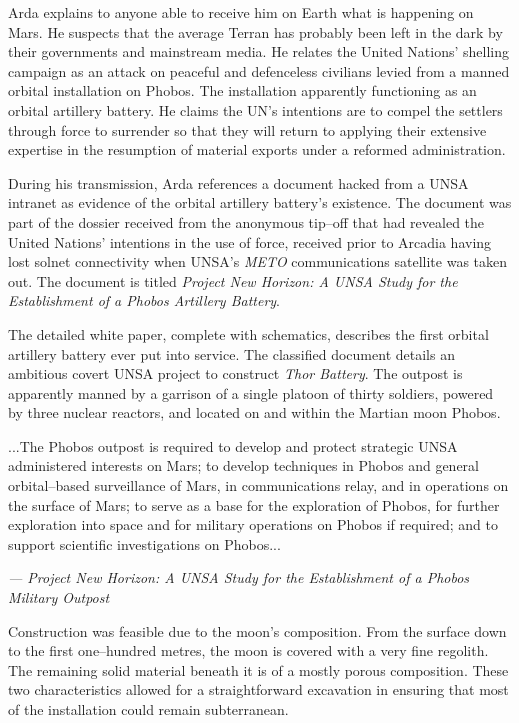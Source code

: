 Arda explains to anyone able to receive him on Earth what is happening on Mars. He suspects that the average Terran has probably been left in the dark by their governments and mainstream media. He relates the United Nations' shelling campaign as an attack on peaceful and defenceless civilians levied from a manned orbital installation on Phobos. The installation apparently functioning as an orbital artillery battery. He claims the UN's intentions are to compel the settlers through force to surrender so that they will return to applying their extensive expertise in the resumption of material exports under a reformed administration.

During his transmission, Arda references a document hacked from a UNSA intranet as evidence of the orbital artillery battery's existence. The document was part of the dossier received from the anonymous tip--off that had revealed the United Nations' intentions in the use of force, received prior to Arcadia having lost solnet connectivity when UNSA's {\it METO} communications satellite was taken out. The document is titled {\it Project New Horizon: A UNSA Study for the Establishment of a Phobos Artillery Battery}.

The detailed white paper, complete with schematics, describes the first orbital artillery battery ever put into service. The classified document details an ambitious covert UNSA project to construct {\it Thor Battery}. The outpost is apparently manned by a garrison of a single platoon of thirty soldiers, powered by three nuclear reactors, and located on and within the Martian moon Phobos. 

\startTimelineGeneralDocument
...The Phobos outpost is required to develop and protect strategic UNSA administered interests on Mars; to develop techniques in Phobos and general orbital--based surveillance of Mars, in communications relay, and in operations on the surface of Mars; to serve as a base for the exploration of Phobos, for further exploration into space and for military operations on Phobos if required; and to support scientific investigations on Phobos...

\hskip 1.5cm {\it --- Project New Horizon: A UNSA Study for the Establishment of a Phobos Military Outpost}
\stopTimelineGeneralDocument

Construction was feasible due to the moon's composition. From the surface down to the first one--hundred metres, the moon is covered with a very fine regolith. The remaining solid material beneath it is of a mostly porous composition. These two characteristics allowed for a straightforward excavation in ensuring that most of the installation could remain subterranean.

